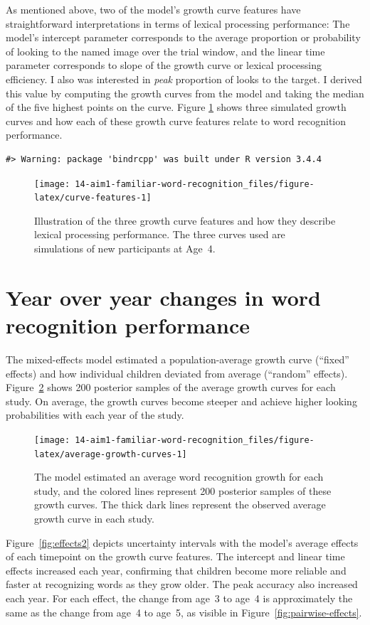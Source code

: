 \documentclass [11pt, proquest] {uwthesis}[2015/03/03]
\begin{document}
As mentioned above, two of the model's growth curve features have
straightforward interpretations in terms of lexical processing
performance: The model's intercept parameter corresponds to the average
proportion or probability of looking to the named image over the trial
window, and the linear time parameter corresponds to slope of the growth
curve or lexical processing efficiency. I also was interested in
\emph{peak} proportion of looks to the target. I derived this value by
computing the growth curves from the model and taking the median of the
five highest points on the curve. Figure \ref{fig:curve-features} shows
three simulated growth curves and how each of these growth curve
features relate to word recognition performance.




\begin{verbatim}
#> Warning: package 'bindrcpp' was built under R version 3.4.4
\end{verbatim}
\begin{figure}
\texttt{[image: 14-aim1-familiar-word-recognition\_files/figure-latex/curve-features-1]} \caption{Illustration of the three growth curve features and
how they describe lexical processing performance. The three curves used
are simulations of new participants at Age~4.}\label{fig:curve-features}
\end{figure}
\section{Year over year changes in word recognition
performance}\label{year-over-year-changes-in-word-recognition-performance}

The mixed-effects model estimated a population-average growth curve
(``fixed'' effects) and how individual children deviated from average
(``random'' effects). Figure~\ref{fig:average-growth-curves} shows 200
posterior samples of the average growth curves for each study. On
average, the growth curves become steeper and achieve higher looking
probabilities with each year of the study.





\begin{figure}
\texttt{[image: 14-aim1-familiar-word-recognition\_files/figure-latex/average-growth-curves-1]} \caption{The model estimated an average word
recognition growth for each study, and the colored lines represent 200
posterior samples of these growth curves. The thick dark lines represent
the observed average growth curve in each study.}\label{fig:average-growth-curves}
\end{figure}
Figure~\ref{fig:effects2} depicts uncertainty intervals with the model's
average effects of each timepoint on the growth curve features. The
intercept and linear time effects increased each year, confirming that
children become more reliable and faster at recognizing words as they
grow older. The peak accuracy also increased each year. For each effect,
the change from age~3 to age~4 is approximately the same as the change
from age~4 to age~5, as visible in Figure~\ref{fig:pairwise-effects}.
\end{document}
